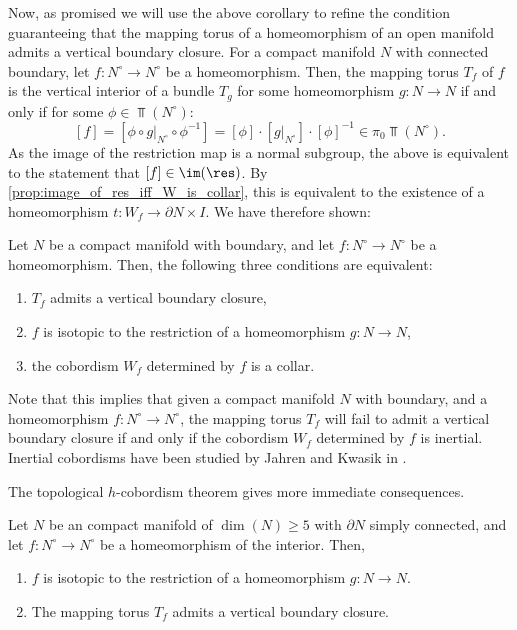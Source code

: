 Now, as promised we will use the above corollary to refine the condition guaranteeing that the mapping torus of a homeomorphism of an open manifold admits a vertical boundary closure. For a compact manifold $N$ with connected boundary, let $f:N^{\circ}\to N^{\circ}$ be a homeomorphism. Then, the mapping torus $T_f$ of $f$ is the vertical interior of a bundle $T_g$ for some homeomorphism $g:N\to N$ if and only if for some $\phi\in\Top(N^{\circ})$:
\[
    [f] = [\phi\circ g|_{N^{\circ}}\circ\phi^{-1}] = [\phi]\cdot[g|_{N^{\circ}}]\cdot[\phi]^{-1} \in \pi_0\Top(N^{\circ}).
\]
As the image of the restriction map is a normal subgroup, the above is equivalent to the statement that $[f]\in\im(\res)$. By \cref{prop:image_of_res_iff_W_is_collar}, this is equivalent to the existence of a homeomorphism $t:W_f\to\partial{N}\times I$. We have therefore shown:

\begin{cor}
    Let $N$ be a compact manifold with boundary, and let $f:N^{\circ}\to N^{\circ}$ be a homeomorphism. Then, the following three conditions are equivalent:
    \begin{enumerate}
    \item $T_f$ admits a vertical boundary closure,
    \item $f$ is isotopic to the restriction of a homeomorphism $g:N\to N$,
    \item the cobordism $W_f$ determined by $f$ is a collar.    
    \end{enumerate}
\end{cor}

\begin{remx}
    Note that this implies that given a compact manifold $N$ with boundary, and a homeomorphism $f:N^{\circ}\to N^{\circ}$, the mapping torus $T_f$ will fail to admit a vertical boundary closure if and only if the cobordism $W_f$ determined by $f$ is inertial. Inertial cobordisms have been studied by Jahren and Kwasik in \cite{jahren2018whitehead}.
\end{remx}

The topological $h$-cobordism theorem gives more immediate consequences. 
\begin{cor}
Let $N$ be an compact manifold of $\dim(N)\geq 5$ with $\partial{N}$ simply connected, and let $f:N^{\circ}\to N^{\circ}$ be a homeomorphism of the interior. Then, 
    \begin{enumerate}
        \item $f$ is isotopic to the restriction of a homeomorphism $g:N\to N$. 
        \item The mapping torus $T_f$ admits a vertical boundary closure.
    \end{enumerate}
\end{cor}


